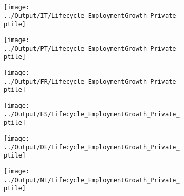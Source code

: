 \documentclass[12pt,notitlepage]{article}
\begin{document}
\begin{figure}[!htpb]
\centering
\caption{Employment Growth (Percentile - Private)}
\begin{subfigure}{.49\textwidth}
    \centering
 \texttt{[image: ../Output/IT/Lifecycle\_EmploymentGrowth\_Private\_ptile]}
\end{subfigure}%
\begin{subfigure}{.49\textwidth}
    \centering
 \texttt{[image: ../Output/PT/Lifecycle\_EmploymentGrowth\_Private\_ptile]}
\end{subfigure}
\begin{subfigure}{.49\textwidth}
    \centering
 \texttt{[image: ../Output/FR/Lifecycle\_EmploymentGrowth\_Private\_ptile]}
\end{subfigure}%
\begin{subfigure}{.49\textwidth}
    \centering
 \texttt{[image: ../Output/ES/Lifecycle\_EmploymentGrowth\_Private\_ptile]}
\end{subfigure}
\begin{subfigure}{.49\textwidth}
    \centering
 \texttt{[image: ../Output/DE/Lifecycle\_EmploymentGrowth\_Private\_ptile]}
\end{subfigure}
\begin{subfigure}{.49\textwidth}
    \centering
 \texttt{[image: ../Output/NL/Lifecycle\_EmploymentGrowth\_Private\_ptile]}
\end{subfigure}
\end{figure}
\pagebreak
\end{document}
